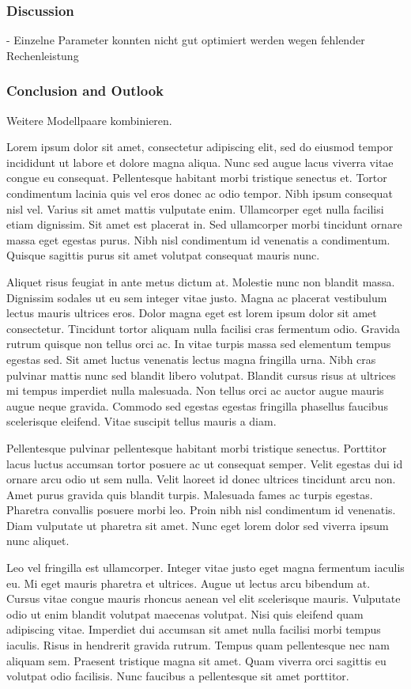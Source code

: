 \documentclass[runningheads]{llncs}
\begin{document}
\subsubsection{Discussion}
- Einzelne Parameter konnten nicht gut optimiert werden wegen fehlender Rechenleistung
\subsubsection{Conclusion and Outlook}
Weitere Modellpaare kombinieren.


Lorem ipsum dolor sit amet, consectetur adipiscing elit, sed do eiusmod tempor incididunt ut labore et dolore magna aliqua. Nunc sed augue lacus viverra vitae congue eu consequat. Pellentesque habitant morbi tristique senectus et. Tortor condimentum lacinia quis vel eros donec ac odio tempor. Nibh ipsum consequat nisl vel. Varius sit amet mattis vulputate enim. Ullamcorper eget nulla facilisi etiam dignissim. Sit amet est placerat in. Sed ullamcorper morbi tincidunt ornare massa eget egestas purus. Nibh nisl condimentum id venenatis a condimentum. Quisque sagittis purus sit amet volutpat consequat mauris nunc.

Aliquet risus feugiat in ante metus dictum at. Molestie nunc non blandit massa. Dignissim sodales ut eu sem integer vitae justo. Magna ac placerat vestibulum lectus mauris ultrices eros. Dolor magna eget est lorem ipsum dolor sit amet consectetur. Tincidunt tortor aliquam nulla facilisi cras fermentum odio. Gravida rutrum quisque non tellus orci ac. In vitae turpis massa sed elementum tempus egestas sed. Sit amet luctus venenatis lectus magna fringilla urna. Nibh cras pulvinar mattis nunc sed blandit libero volutpat. Blandit cursus risus at ultrices mi tempus imperdiet nulla malesuada. Non tellus orci ac auctor augue mauris augue neque gravida. Commodo sed egestas egestas fringilla phasellus faucibus scelerisque eleifend. Vitae suscipit tellus mauris a diam.

Pellentesque pulvinar pellentesque habitant morbi tristique senectus. Porttitor lacus luctus accumsan tortor posuere ac ut consequat semper. Velit egestas dui id ornare arcu odio ut sem nulla. Velit laoreet id donec ultrices tincidunt arcu non. Amet purus gravida quis blandit turpis. Malesuada fames ac turpis egestas. Pharetra convallis posuere morbi leo. Proin nibh nisl condimentum id venenatis. Diam vulputate ut pharetra sit amet. Nunc eget lorem dolor sed viverra ipsum nunc aliquet.

Leo vel fringilla est ullamcorper. Integer vitae justo eget magna fermentum iaculis eu. Mi eget mauris pharetra et ultrices. Augue ut lectus arcu bibendum at. Cursus vitae congue mauris rhoncus aenean vel elit scelerisque mauris. Vulputate odio ut enim blandit volutpat maecenas volutpat. Nisi quis eleifend quam adipiscing vitae. Imperdiet dui accumsan sit amet nulla facilisi morbi tempus iaculis. Risus in hendrerit gravida rutrum. Tempus quam pellentesque nec nam aliquam sem. Praesent tristique magna sit amet. Quam viverra orci sagittis eu volutpat odio facilisis. Nunc faucibus a pellentesque sit amet porttitor.
\end{document}

